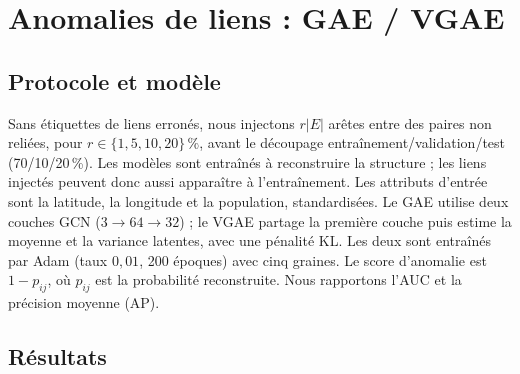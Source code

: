 \section{Anomalies de liens : GAE / VGAE}
\label{sec:liens}

\subsection{Protocole et modèle}

Sans étiquettes de liens erronés, nous injectons $r|E|$ arêtes entre des paires non reliées, pour $r\in\{1,5,10,20\}\,\%$, avant le découpage entraînement/validation/test (70/10/20\,\%). Les modèles sont entraînés à reconstruire la structure ; les liens injectés peuvent donc aussi apparaître à l'entraînement. Les attributs d'entrée sont la latitude, la longitude et la population, standardisées. Le GAE utilise deux couches GCN ($3\to64\to32$) ; le VGAE partage la première couche puis estime la moyenne et la variance latentes, avec une pénalité KL. Les deux sont entraînés par Adam (taux $0{,}01$, 200 époques) avec cinq graines. Le score d'anomalie est $1-p_{ij}$, où $p_{ij}$ est la probabilité reconstruite. Nous rapportons l'AUC et la précision moyenne (AP).

\subsection{Résultats}

